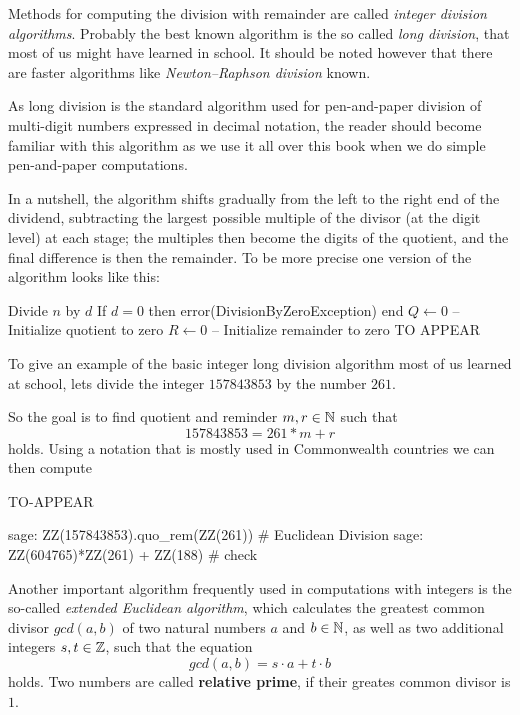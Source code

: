 Methods for computing the division with remainder are called \textit{integer division algorithms}. Probably the best known algorithm is the so called \textit{long division}, that most of us might have learned in school. It should be noted however that there are faster algorithms like \textit{Newton–Raphson division} known.

As long division is the standard algorithm used for pen-and-paper division of multi-digit numbers expressed in decimal notation, the reader should become familiar with this algorithm as we use it all over this book when we do simple pen-and-paper computations.

In a nutshell, the algorithm shifts gradually from the left to the right end of the dividend, subtracting the largest possible multiple of the divisor (at the digit level) at each stage; the multiples then become the digits of the quotient, and the final difference is then the remainder. To be more precise one version of the algorithm looks like this:

\begin{algorithmic}
\State Divide $n$ by $d$
\State If $d = 0$ then error(DivisionByZeroException) end
\State $Q \leftarrow 0 $ -- Initialize quotient to zero
\State $R \leftarrow 0 $ -- Initialize remainder to zero               
\State TO APPEAR
\end{algorithmic}

\begin{example} To give an example of the basic integer long division algorithm most of us learned at school, lets divide the integer $157843853$ by the number $261$. 

So the goal is to find quotient and reminder $m,r \in \mathbb{N}$ such that
$$157843853 = 261 * m +r$$
holds. Using a notation that is mostly used in Commonwealth countries we can then compute

TO-APPEAR 
\end{example}

\begin{sagecommandline}
sage: ZZ(157843853).quo_rem(ZZ(261)) # Euclidean Division
sage: ZZ(604765)*ZZ(261) + ZZ(188) # check
\end{sagecommandline}


Another important algorithm frequently used in computations with integers is the so-called \textit{extended Euclidean algorithm}, which calculates the greatest common divisor $ gcd (a, b) $ of two natural numbers $ a $ and $ b \in \mathbb{N} $, as well as two additional integers $ s, t \in \mathbb{Z} $, such that the equation
\begin{equation}
\label{eq: erw_Eukl_algo}
gcd (a, b) = s \cdot a + t \cdot b
\end{equation}
holds. Two numbers are called \textbf{relative prime}, if their greates common divisor is $1$.

